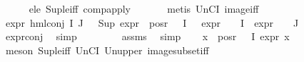 \begin{isabellebody}
\ \ \ \ \isamarkupfalse%
\ e{}{\isacharunderscore}{\kern0pt}le{\isacharunderscore}{\kern0pt}{}\ Sup{\isacharunderscore}{\kern0pt}le{\isacharunderscore}{\kern0pt}iff\ comp{\isacharunderscore}{\kern0pt}apply\ \isanewline
\ \ \ \ \isamarkupfalse%
\ {\isacharparenleft}{\kern0pt}metis\ UnCI\ image{\isacharunderscore}{\kern0pt}iff{\isacharparenright}{\kern0pt}{\isacharplus}{\kern0pt}\isanewline
\ \ \isamarkupfalse%
\ {\isachardoublequoteopen}expr{\isacharunderscore}{\kern0pt}{}\ {\isacharparenleft}{\kern0pt}hml{\isacharunderscore}{\kern0pt}conj\ I\ J\ {\isasymPhi}{\isacharparenright}{\kern0pt}\ {\isacharequal}{\kern0pt}\ Sup\ {\isacharparenleft}{\kern0pt}{\isacharparenleft}{\kern0pt}expr{\isacharunderscore}{\kern0pt}{}\ {\isacharbackquote}{\kern0pt}\ {\isacharparenleft}{\kern0pt}pos{\isacharunderscore}{\kern0pt}r\ {\isacharparenleft}{\kern0pt}{\isasymPhi}\ {\isacharbackquote}{\kern0pt}\ I{\isacharparenright}{\kern0pt}{\isacharparenright}{\kern0pt}{\isacharparenright}{\kern0pt}\ \ {\isasymunion}\ {\isacharparenleft}{\kern0pt}expr{\isacharunderscore}{\kern0pt}{}\ {\isasymcirc}\ {\isasymPhi}{\isacharparenright}{\kern0pt}\ {\isacharbackquote}{\kern0pt}\ I\ {\isasymunion}\ {\isacharparenleft}{\kern0pt}expr{\isacharunderscore}{\kern0pt}{}\ {\isasymcirc}\ {\isasymPhi}{\isacharparenright}{\kern0pt}\ {\isacharbackquote}{\kern0pt}\ J{\isacharparenright}{\kern0pt}{\isachardoublequoteclose}\isanewline
\ \ \ \ \isamarkupfalse%
\ expr{\isacharunderscore}{\kern0pt}{}{\isacharunderscore}{\kern0pt}conj\ \isamarkupfalse%
\ simp\isanewline
\ \ \isamarkupfalse%
\ {\isachardoublequoteopen}{\isachardot}{\kern0pt}{\isachardot}{\kern0pt}{\isachardot}{\kern0pt}\ {\isasymle}\ {}{\isachardoublequoteclose}\ \isamarkupfalse%
\ assms\ \isamarkupfalse%
\ simp\isanewline
\ \ \isamarkupfalse%
\ {\isachardoublequoteopen}{\isasymforall}x\ {\isasymin}\ {\isacharparenleft}{\kern0pt}pos{\isacharunderscore}{\kern0pt}r\ {\isacharparenleft}{\kern0pt}{\isasymPhi}\ {\isacharbackquote}{\kern0pt}\ I{\isacharparenright}{\kern0pt}{\isacharparenright}{\kern0pt}{\isachardot}{\kern0pt}\ expr{\isacharunderscore}{\kern0pt}{}\ x\ {\isasymle}\ {}{\isachardoublequoteclose}\ \isanewline
\ \ \ \ \isamarkupfalse%
\ {\isacharparenleft}{\kern0pt}meson\ Sup{\isacharunderscore}{\kern0pt}le{\isacharunderscore}{\kern0pt}iff\ UnCI\ Un{\isacharunderscore}{\kern0pt}upper{}\ image{\isacharunderscore}{\kern0pt}subset{\isacharunderscore}{\kern0pt}iff{\isacharparenright}{\kern0pt}\isanewline

\end{isabellebody}
